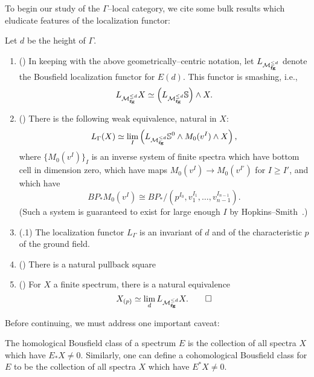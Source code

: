 To begin our study of the $\Gamma$--local category, we cite some bulk results which eludicate features of the localization functor:
\begin{theorem}\label{HoveyMooreSpectrumLemma}
Let $d$ be the height of $\Gamma$.
\begin{enumerate}
\item (\cite[Theorem 7.5.6]{RavenelOrangeBook}) In keeping with the above geometrically--centric notation, let $L_{\mathcal{M}_{\mathbf{fg}}^{\le d}}$ denote the Bousfield localization functor for $E(d)$.  This functor is smashing, i.e., \[L_{\mathcal{M}_{\mathbf{fg}}^{\le d}} X \simeq \left(L_{\mathcal{M}_{\mathbf{fg}}^{\le d}} \mathbb S\right) \wedge X.\]
\item (\cite[Lemma 2.3]{HoveyCSC}) There is the following weak equivalence, natural in $X$: \[L_\Gamma(X) \simeq \lim_I \left(L_{\mathcal{M}_{\mathbf{fg}}^{\le d}} \mathbb S^0 \wedge M_0(v^I) \wedge X\right),\] where $\{M_0(v^I)\}_I$ is an inverse system of finite spectra which have bottom cell in dimension zero, which have maps $M_0(v^I) \to M_0(v^{I'})$ for $I \ge I'$, and which have \[BP_* M_0(v^I) \cong BP_* / (p^{I_0}, v_1^{I_1}, \ldots, v_{n-1}^{I_{n-1}}).\]  (Such a system is guaranteed to exist for large enough $I$ by Hopkins--Smith~\cite[Proposition 5.14]{HopkinsSmith}.)
\item (.1) The localization functor $L_\Gamma$ is an invariant of $d$ and of the characteristic $p$ of the ground field.
\item (\cite[Theorem 2.1.d, Lemma 2.3]{RavenelLocalizationWRTPeriodic}) There is a natural pullback square
\begin{center}
\end{center}
\item (\cite[Theorem 7.5.7]{RavenelOrangeBook}) For $X$ a finite spectrum, there is a natural equivalence \[X_{(p)} \simeq \lim_d L_{\mathcal{M}_{\mathbf{fg}}^{\le d}} X. \qed \]
\end{enumerate}
\end{theorem}

Before continuing, we must address one important caveat:

\begin{definition}
The homological Bousfield class of a spectrum $E$ is the collection of all spectra $X$ which have $E_* X \ne 0$.  Similarly, one can define a cohomological Bousfield class for $E$ to be the collection of all spectra $X$ which have $E^* X \ne 0$.
\end{definition}


